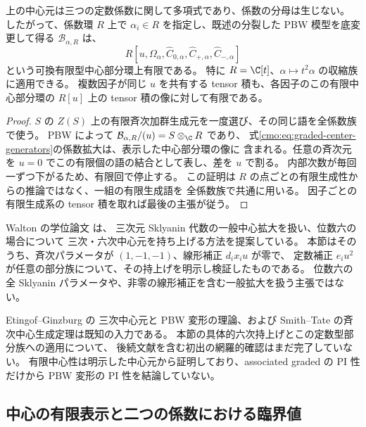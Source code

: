 \begin{corollary}[係数族に一様な有限中心模型]
\label{cmo:cor:relative-finite-center}
上の中心元は三つの定数係数に関して多項式であり、係数の分母は生じない。
したがって、係数環 $R$ 上で $\alpha_i\in R$ を指定し、既述の分裂した
PBW 模型を底変更して得る $\mathcal B_{\alpha,R}$ は、
\[
 R[u,\Omega_\alpha,
       \widehat C_{0,\alpha},\widehat C_{+,\alpha},\widehat C_{-,\alpha}]
\]
という可換有限型中心部分環上有限である。
特に $R=\C[t]$、$\alpha\mapsto t^2\alpha$ の収縮族に適用できる。
複数因子が同じ $u$ を共有する tensor 積も、各因子のこの有限中心部分環の
$R[u]$ 上の tensor 積の像に対して有限である。
\end{corollary}

\begin{proof}
$S$ の $Z(S)$ 上の有限斉次加群生成元を一度選び、その同じ語を全係数族で使う。
PBW によって $\mathcal B_{\alpha,R}/(u)=S\otimes_\C R$ であり、
式\eqref{cmo:eq:graded-center-generators}の係数拡大は、表示した中心部分環の像に
含まれる。任意の斉次元を $u=0$ でこの有限個の語の結合として表し、差を $u$ で割る。
内部次数が毎回一ずつ下がるため、有限回で停止する。
この証明は $R$ の点ごとの有限生成性からの推論ではなく、一組の有限生成語を
全係数族で共通に用いる。
因子ごとの有限生成系の tensor 積を取れば最後の主張が従う。
\end{proof}

\begin{remark}[先行研究との関係と新規性の範囲]
\label{cmo:rem:pi-center-literature}
Walton の学位論文 \cite[Definition~V.1, Remark~V.16]{CMOWaltonThesis} は、
三次元 Sklyanin 代数の一般中心拡大を扱い、位数六の場合について
三次・六次中心元を持ち上げる方法を提案している。
本節はそのうち、斉次パラメータが $(1,-1,-1)$、線形補正 $d_i x_i u$ が零で、
定数補正 $e_i u^2$ が任意の部分族について、その持上げを明示し検証したものである。
位数六の全 Sklyanin パラメータや、非零の線形補正を含む一般拡大を扱う主張ではない。

Etingof--Ginzburg \cite[Theorem~3.3.2 and Section~9]{NFMEG} の
三次中心元と PBW 変形の理論、および Smith--Tate の斉次中心生成定理は既知の入力である。
本節の具体的六次持上げとこの定数型部分族への適用について、
後続文献を含む初出の網羅的確認はまだ完了していない。
有限中心性は明示した中心元から証明しており、associated graded の PI 性だけから
PBW 変形の PI 性を結論していない。
\end{remark}

\subsection{中心の有限表示と二つの係数における臨界値}
\label{cmo:subsec:effective-center-geometry}

